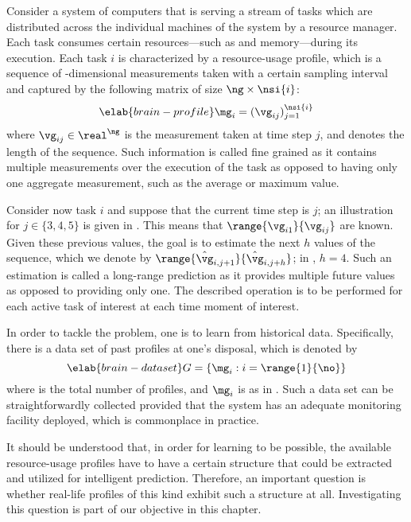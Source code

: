 Consider a system of computers that is serving a stream of tasks which are
distributed across the individual machines of the system by a resource manager.
Each task consumes certain resources---such as  and memory---during its
execution. Each task $i$ is characterized by a resource-usage profile, which is
a sequence of \ng-dimensional measurements taken with a certain sampling
interval and captured by the following matrix of size $\ng \times \nsi{i}$:
\begin{equation} \elab{brain-profile}
  \mg_i = (\vg_{ij})_{j = 1}^\nsi{i}
\end{equation}
where $\vg_{ij} \in \real^\ng$ is the measurement taken at time step $j$, and
 denotes the length of the sequence. Such information is called fine
grained as it contains multiple measurements over the execution of the task as
opposed to having only one aggregate measurement, such as the average or maximum
value.

Consider now task $i$ and suppose that the current time step is $j$; an
illustration for $j \in \{ 3, 4, 5 \}$ is given in .
This means that $\range{\vg_{i1}}{\vg_{ij}}$ are known. Given these previous
values, the goal is to estimate the next $h$ values of the sequence, which we
denote by $\range{\hat{\vg}_{i, j + 1}}{\hat{\vg}_{i, j + h}}$; in
, $h = 4$. Such an estimation is called a long-range
prediction as it provides multiple future values as opposed to providing only
one. The described operation is to be performed for each active task of interest
at each time moment of interest.

In order to tackle the problem, one is to learn from historical data.
Specifically, there is a data set of past profiles at one's disposal, which is
denoted by
\begin{equation} \elab{brain-dataset}
  G = \left\{ \mg_i: i = \range{1}{\no} \right\}
\end{equation}
where \no is the total number of profiles, and $\mg_i$ is as in
. Such a data set can be straightforwardly collected
provided that the system has an adequate monitoring facility deployed, which is
commonplace in practice.

It should be understood that, in order for learning to be possible, the
available resource-usage profiles have to have a certain structure that could be
extracted and utilized for intelligent prediction. Therefore, an important
question is whether real-life profiles of this kind exhibit such a structure at
all. Investigating this question is part of our objective in this chapter.
